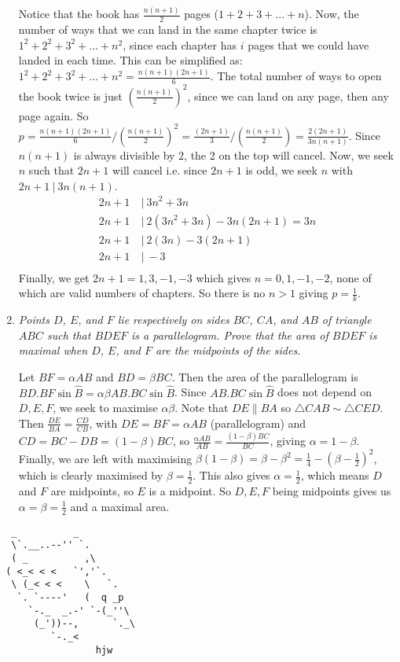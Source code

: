 \documentclass{article}
\begin{document}
\begin{enumerate}[1.]
Notice that the book has $\frac{n(n+1)}{2}$ pages ($1+2+3+...+n$). Now, the number of ways that we can land in the same chapter twice is $1^2+2^2+3^2+...+n^2$, since each chapter has $i$ pages that we could have landed in each time. This can be simplified as: $1^2+2^2+3^2+...+n^2 = \frac{n(n+1)(2n+1)}{6}$. The total number of ways to open the book twice is just $(\frac{n(n+1)}{2})^2$, since we can land on any page, then any page again. So $p = \frac{n(n+1)(2n+1)}{6}/(\frac{n(n+1)}{2})^2 = \frac{(2n+1)}{3}/(\frac{n(n+1)}{2})=\frac{2(2n+1)}{3n(n+1)}$. Since $n(n+1)$ is always divisible by 2, the 2 on the top will cancel. Now, we seek $n$ such that $2n+1$ will cancel i.e. since $2n+1$ is odd, we seek $n$ with $2n+1\:|\: 3n(n+1)$.
\begin{align*}
2n+1\:&|\: 3n^2+3n\\
2n+1\:&|\: 2(3n^2+3n)-3n(2n+1) = 3n\\
2n+1\:&|\: 2(3n)-3(2n+1)\\
2n+1\:&|\: -3\\
\end{align*}
Finally, we get $2n+1=1,3,-1,-3$ which gives $n=0,1,-1,-2$, none of which are valid numbers of chapters. So there is no $n>1$ giving $p=\frac{1}{k}$.


\item %
{\itshape Points $D$, $E$, and $F$ lie respectively on sides $BC$, $CA$, and $AB$ of triangle $ABC$ such that $BDEF$ is a parallelogram. Prove that the area of $BDEF$ is maximal when $D$, $E$, and $F$ are the midpoints of the sides.}

Let $BF=\alpha AB$ and $BD=\beta BC$. Then the area of the parallelogram is $BD.BF\sin{\hat{B}} = \alpha \beta AB.BC\sin{\hat{B}}$. Since $AB.BC\sin{\hat{B}}$ does not depend on $D,E,F$, we seek to maximise $\alpha \beta$. Note that $DE\parallel BA$ so $\triangle CAB \sim \triangle CED$. Then $\frac{DE}{BA}=\frac{CD}{CB}$, with $DE=BF=\alpha AB$ (parallelogram) and $CD=BC-DB=(1-\beta)BC$, so $\frac{\alpha AB}{AB}=\frac{(1-\beta)BC}{BC}$, giving $\alpha = 1-\beta$. Finally, we are left with maximising $\beta (1-\beta) = \beta - \beta^2 = \frac{1}{4}-(\beta-\frac{1}{2})^2$, which is clearly maximised by $\beta=\frac{1}{2}$. This also gives $\alpha=\frac{1}{2}$, which means $D$ and $F$ are midpoints, so $E$ is a midpoint. So $D,E,F$ being midpoints gives us $\alpha=\beta=\frac{1}{2}$ and a maximal area.


\end{enumerate}

\vfill
\centering
\begin{BVerbatim}
  _          _
  \`.__..--'' `.
  ( _          ,\
 ( <_< < <   `','`.
  \ (_< < <    \   `.
   `. `----'   (  q _p
     `-._  _.-' `-(_''\
      (_'))--,      `._\
         `-._<
                 hjw
\end{BVerbatim}
\end{document}
